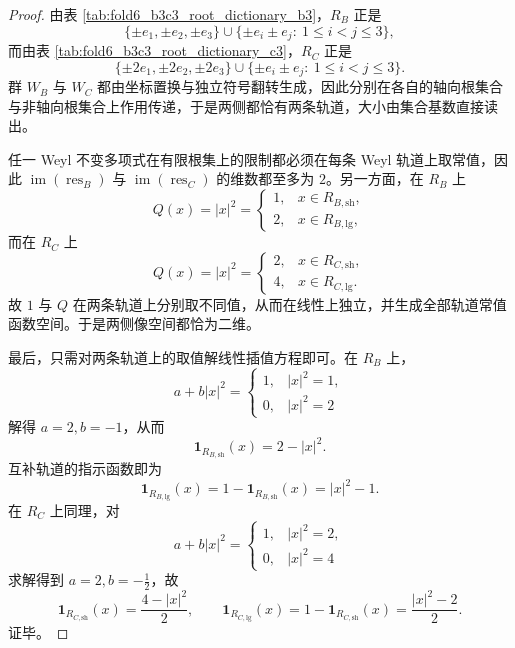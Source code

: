 \begin{proof}
由表 \ref{tab:fold6_b3c3_root_dictionary_b3}，\(R_B\) 正是
\[
\{\pm e_1,\pm e_2,\pm e_3\}\cup \{\pm e_i\pm e_j:\ 1\le i<j\le 3\},
\]
而由表 \ref{tab:fold6_b3c3_root_dictionary_c3}，\(R_C\) 正是
\[
\{\pm 2e_1,\pm 2e_2,\pm 2e_3\}\cup \{\pm e_i\pm e_j:\ 1\le i<j\le 3\}.
\]
群 \(W_B\) 与 \(W_C\) 都由坐标置换与独立符号翻转生成，因此分别在各自的轴向根集合与非轴向根集合上作用传递，于是两侧都恰有两条轨道，大小由集合基数直接读出。

任一 Weyl 不变多项式在有限根集上的限制都必须在每条 Weyl 轨道上取常值，因此 \(\operatorname{im}(\operatorname{res}_B)\) 与 \(\operatorname{im}(\operatorname{res}_C)\) 的维数都至多为 \(2\)。另一方面，在 \(R_B\) 上
\[
Q(x)=|x|^2=
\begin{cases}
1,& x\in R_{B,\mathrm{sh}},\\
2,& x\in R_{B,\mathrm{lg}},
\end{cases}
\]
而在 \(R_C\) 上
\[
Q(x)=|x|^2=
\begin{cases}
2,& x\in R_{C,\mathrm{sh}},\\
4,& x\in R_{C,\mathrm{lg}}.
\end{cases}
\]
故 \(1\) 与 \(Q\) 在两条轨道上分别取不同值，从而在线性上独立，并生成全部轨道常值函数空间。于是两侧像空间都恰为二维。

最后，只需对两条轨道上的取值解线性插值方程即可。在 \(R_B\) 上，
\[
a+b|x|^2=
\begin{cases}
1,& |x|^2=1,\\
0,& |x|^2=2
\end{cases}
\]
解得 \(a=2,b=-1\)，从而
\[
\mathbf 1_{R_{B,\mathrm{sh}}}(x)=2-|x|^2.
\]
互补轨道的指示函数即为
\[
\mathbf 1_{R_{B,\mathrm{lg}}}(x)=1-\mathbf 1_{R_{B,\mathrm{sh}}}(x)=|x|^2-1.
\]
在 \(R_C\) 上同理，对
\[
a+b|x|^2=
\begin{cases}
1,& |x|^2=2,\\
0,& |x|^2=4
\end{cases}
\]
求解得到 \(a=2,b=-\frac12\)，故
\[
\mathbf 1_{R_{C,\mathrm{sh}}}(x)=\frac{4-|x|^2}{2},
\qquad
\mathbf 1_{R_{C,\mathrm{lg}}}(x)=1-\mathbf 1_{R_{C,\mathrm{sh}}}(x)=\frac{|x|^2-2}{2}.
\]
证毕。
\end{proof}

